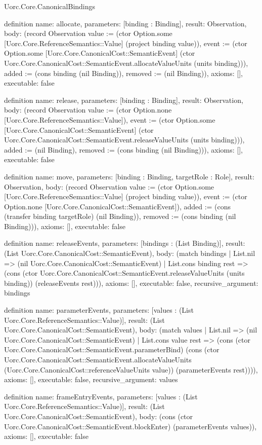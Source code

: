 \begin{lexlean}{Uorc.Core.CanonicalBindings}
\begin{semanticmodule}
definition{
  name: allocate,
  parameters: [binding : Binding],
  result: Observation,
  body: (record Observation {value := (ctor Option.some [Uorc.Core.ReferenceSemantics::Value] (project binding value)), event := (ctor Option.some [Uorc.Core.CanonicalCost::SemanticEvent] (ctor Uorc.Core.CanonicalCost::SemanticEvent.allocateValueUnits (units binding))), added := (cons binding (nil Binding)), removed := (nil Binding)}),
  axioms: [],
  executable: false
}

definition{
  name: release,
  parameters: [binding : Binding],
  result: Observation,
  body: (record Observation {value := (ctor Option.none [Uorc.Core.ReferenceSemantics::Value]), event := (ctor Option.some [Uorc.Core.CanonicalCost::SemanticEvent] (ctor Uorc.Core.CanonicalCost::SemanticEvent.releaseValueUnits (units binding))), added := (nil Binding), removed := (cons binding (nil Binding))}),
  axioms: [],
  executable: false
}

definition{
  name: move,
  parameters: [binding : Binding, targetRole : Role],
  result: Observation,
  body: (record Observation {value := (ctor Option.some [Uorc.Core.ReferenceSemantics::Value] (project binding value)), event := (ctor Option.none [Uorc.Core.CanonicalCost::SemanticEvent]), added := (cons (transfer binding targetRole) (nil Binding)), removed := (cons binding (nil Binding))}),
  axioms: [],
  executable: false
}

definition{
  name: releaseEvents,
  parameters: [bindings : (List Binding)],
  result: (List Uorc.Core.CanonicalCost::SemanticEvent),
  body: (match bindings
    | List.nil => (nil Uorc.Core.CanonicalCost::SemanticEvent)
    | List.cons binding rest => (cons (ctor Uorc.Core.CanonicalCost::SemanticEvent.releaseValueUnits (units binding)) (releaseEvents rest))),
  axioms: [],
  executable: false,
  recursive_argument: bindings
}

definition{
  name: parameterEvents,
  parameters: [values : (List Uorc.Core.ReferenceSemantics::Value)],
  result: (List Uorc.Core.CanonicalCost::SemanticEvent),
  body: (match values
    | List.nil => (nil Uorc.Core.CanonicalCost::SemanticEvent)
    | List.cons value rest => (cons (ctor Uorc.Core.CanonicalCost::SemanticEvent.parameterBind) (cons (ctor Uorc.Core.CanonicalCost::SemanticEvent.allocateValueUnits (Uorc.Core.CanonicalCost::referenceValueUnits value)) (parameterEvents rest)))),
  axioms: [],
  executable: false,
  recursive_argument: values
}

definition{
  name: frameEntryEvents,
  parameters: [values : (List Uorc.Core.ReferenceSemantics::Value)],
  result: (List Uorc.Core.CanonicalCost::SemanticEvent),
  body: (cons (ctor Uorc.Core.CanonicalCost::SemanticEvent.blockEnter) (parameterEvents values)),
  axioms: [],
  executable: false
}


\end{semanticmodule}
\end{lexlean}
